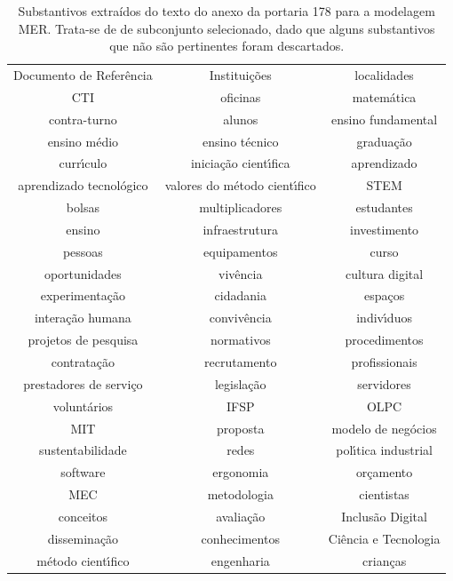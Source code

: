 \documentclass[
12pt,		%
openright,	%
twoside,  %
a4paper,			%
chapter=TITLE,		%
english,			%
french,				%
spanish,			%
brazil				%
]{USPSC-classe/USPSC}
\begin{document}
\begin{table}[htb]
\tiny
\caption{\label{ed98281d009c18519ead0b6dc7fab5fc772f0825}Substantivos extra\'{i}dos do texto do anexo da portaria 178 para a modelagem MER. Trata-se de de subconjunto selecionado, dado que alguns substantivos que n\~ao s\~ao pertinentes foram descartados.}

\centering
\begin{tabular}{|c|c|c|}
\hline
Documento de Refer\^encia  &  Institui\c{c}\~oes  &  localidades \\
CTI  &  oficinas  &  matem\'atica  \\
contra-turno  &  alunos  &  ensino fundamental \\
ensino m\'edio  &  ensino t\'ecnico  &  gradua\c{c}\~ao \\
curr\'{\i}culo  &  inicia\c{c}\~ao cient\'{\i}fica  &  aprendizado \\
aprendizado tecnol\'ogico  &  valores do m\'etodo cient\'{\i}fico  &  STEM \\
bolsas  &  multiplicadores  &  estudantes \\
ensino  &  infraestrutura  &  investimento \\
pessoas  &  equipamentos  &  curso \\
oportunidades  &  viv\^encia  &  cultura digital \\
experimenta\c{c}\~ao  &  cidadania  &  espa\c{c}os \\
intera\c{c}\~ao humana  &  conviv\^encia  &  indiv\'{\i}duos  \\
projetos de pesquisa  &  normativos  &  procedimentos \\
contrata\c{c}\~ao  &  recrutamento  &  profissionais \\
prestadores de servi\c{c}o  &  legisla\c{c}\~ao  &  servidores \\
volunt\'arios  &  IFSP  &  OLPC \\
MIT  &  proposta  &  modelo de neg\'ocios \\
sustentabilidade  &  redes  &  pol\'{\i}tica industrial \\
software  &  ergonomia  &  or\c{c}amento \\
MEC  &  metodologia  &  cientistas  \\
conceitos  &  avalia\c{c}\~ao  &  Inclus\~ao Digital \\
dissemina\c{c}\~ao  &  conhecimentos  &  Ci\^encia e Tecnologia \\
m\'etodo cient\'{\i}fico  &  engenharia  &  crian\c{c}as \\

\end{tabular}
\end{table}
\end{document}
